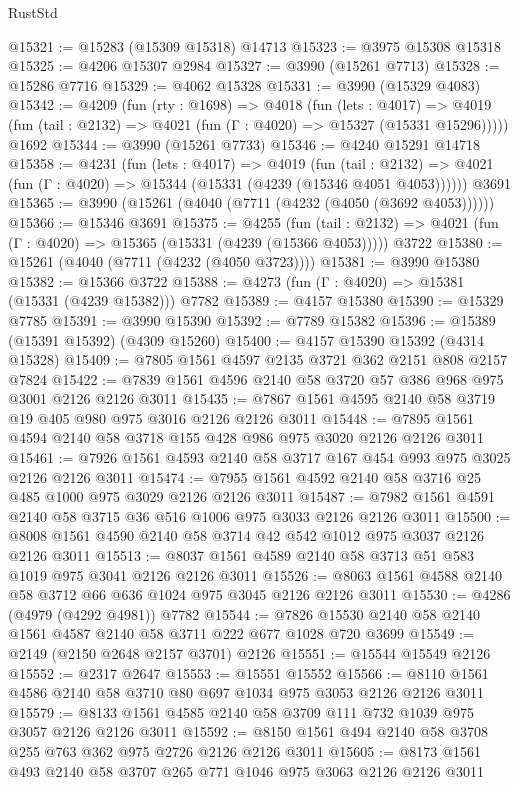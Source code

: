 \begin{lexlean}{RustStd}
\begin{coremodule}
{\begin{coremodule}
{{{{{{{{{{{{{{{{@15321 := @15283 (@15309 @15318) @14713
@15323 := @3975 @15308 @15318
@15325 := @4206 @15307 @2984
@15327 := @3990 (@15261 @7713)
@15328 := @15286 @7716
@15329 := @4062 @15328
@15331 := @3990 (@15329 @4083)
@15342 := @4209
    (fun (rty : @1698) =>
    @4018
      (fun (lets : @4017) =>
      @4019 (fun (tail : @2132) => @4021 (fun (Γ : @4020) => @15327 (@15331 @15296)))))
    @1692
@15344 := @3990 (@15261 @7733)
@15346 := @4240 @15291 @14718
@15358 := @4231
    (fun (lets : @4017) =>
    @4019
      (fun (tail : @2132) =>
      @4021 (fun (Γ : @4020) => @15344 (@15331 (@4239 (@15346 @4051 @4053))))))
    @3691
@15365 := @3990 (@15261 (@4040 (@7711 (@4232 (@4050 (@3692 @4053))))))
@15366 := @15346 @3691
@15375 := @4255
    (fun (tail : @2132) => @4021 (fun (Γ : @4020) => @15365 (@15331 (@4239 (@15366 @4053)))))
    @3722
@15380 := @15261 (@4040 (@7711 (@4232 (@4050 @3723))))
@15381 := @3990 @15380
@15382 := @15366 @3722
@15388 := @4273 (fun (Γ : @4020) => @15381 (@15331 (@4239 @15382))) @7782
@15389 := @4157 @15380
@15390 := @15329 @7785
@15391 := @3990 @15390
@15392 := @7789 @15382
@15396 := @15389 (@15391 @15392) (@4309 @15260)
@15400 := @4157 @15390 @15392 (@4314 @15328)
@15409 := @7805 @1561 @4597 @2135 @3721 @362 @2151 @808 @2157 @7824
@15422 := @7839 @1561 @4596 @2140 @58 @3720 @57 @386 @968 @975 @3001 @2126 @2126 @3011
@15435 := @7867 @1561 @4595 @2140 @58 @3719 @19 @405 @980 @975 @3016 @2126 @2126 @3011
@15448 := @7895 @1561 @4594 @2140 @58 @3718 @155 @428 @986 @975 @3020 @2126 @2126 @3011
@15461 := @7926 @1561 @4593 @2140 @58 @3717 @167 @454 @993 @975 @3025 @2126 @2126 @3011
@15474 := @7955 @1561 @4592 @2140 @58 @3716 @25 @485 @1000 @975 @3029 @2126 @2126 @3011
@15487 := @7982 @1561 @4591 @2140 @58 @3715 @36 @516 @1006 @975 @3033 @2126 @2126 @3011
@15500 := @8008 @1561 @4590 @2140 @58 @3714 @42 @542 @1012 @975 @3037 @2126 @2126 @3011
@15513 := @8037 @1561 @4589 @2140 @58 @3713 @51 @583 @1019 @975 @3041 @2126 @2126 @3011
@15526 := @8063 @1561 @4588 @2140 @58 @3712 @66 @636 @1024 @975 @3045 @2126 @2126 @3011
@15530 := @4286 (@4979 (@4292 @4981)) @7782
@15544 := @7826 @15530 @2140 @58 @2140 @1561 @4587 @2140 @58 @3711 @222 @677 @1028 @720 @3699
@15549 := @2149 (@2150 @2648 @2157 @3701) @2126
@15551 := @15544 @15549 @2126
@15552 := @2317 @2647
@15553 := @15551 @15552
@15566 := @8110 @1561 @4586 @2140 @58 @3710 @80 @697 @1034 @975 @3053 @2126 @2126 @3011
@15579 := @8133 @1561 @4585 @2140 @58 @3709 @111 @732 @1039 @975 @3057 @2126 @2126 @3011
@15592 := @8150 @1561 @494 @2140 @58 @3708 @255 @763 @362 @975 @2726 @2126 @2126 @3011
@15605 := @8173 @1561 @493 @2140 @58 @3707 @265 @771 @1046 @975 @3063 @2126 @2126 @3011
}}}}}}}}}}}}}}}}
\end{coremodule}}
\end{coremodule}
\end{lexlean}
